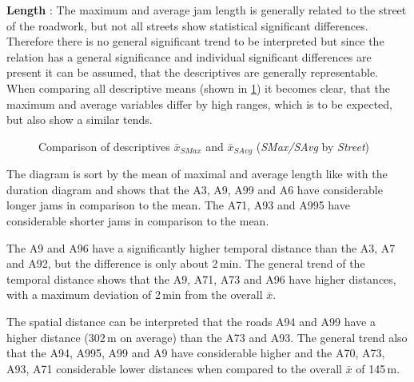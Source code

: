 \textbf{Length} : The maximum and average jam length is generally related to the street of the roadwork, but not all streets show statistical significant differences. Therefore there is no general significant trend to be interpreted but since the relation has a general significance and individual significant differences are present it can be assumed, that the descriptives are generally representable. When comparing all descriptive means (shown in \cref{fig:arbis_summary_Str_spatial}) it becomes clear, that the maximum and average variables differ by high ranges, which is to be expected, but also show a similar tends.
\begin{figure}[ht!]
	\data
	\pgfplotstablesort[sort key=means, sort cmp=float >]{\datasorted}{\data}
	\tiny
	\centering
	\caption{Comparison of descriptives $\bar{x}_{SMax}$ and $\bar{x}_{SAvg}$ (\textit{SMax/SAvg} by \textit{Street})}
	\label{fig:arbis_summary_Str_spatial}
\end{figure}
The diagram is sort by the mean of maximal and average length like with the duration diagram and shows that the A3, A9, A99 and A6 have considerable longer jams in comparison to the mean. The A71, A93 and A995 have considerable shorter jams in comparison to the mean.

The A9 and A96 have a significantly higher temporal distance than the A3, A7 and A92, but the difference is only about 2\,min. The general trend of the temporal distance shows that the A9, A71, A73 and A96 have higher distances, with a maximum deviation of 2\,min from the overall $\bar{x}$.

The spatial distance can be interpreted that the roads A94 and A99 have a higher distance (302\,m on average) than the A73 and A93. The general trend also that the A94, A995, A99 and A9 have considerable higher and the A70, A73, A93, A71 considerable lower distances when compared to the overall $\bar{x}$ of 145\,m.

